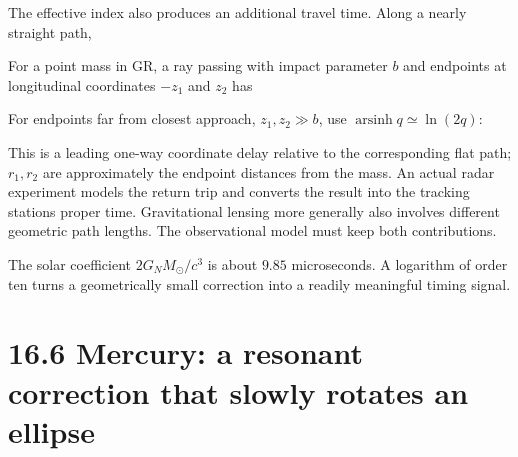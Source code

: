 \documentclass[
  11pt,
  letterpaper,
  oneside,
  openany]{scrbook}
\begin{document}
The effective index also produces an additional travel time. Along a
nearly straight path,

\begin{center}
\begingroup
{}
\ifdim\wd\grmathbox>\linewidth
\resizebox{\linewidth}{!}{\usebox{\grmathbox}}
\else\usebox{\grmathbox}\fi
\endgroup
\end{center}

For a point mass in GR, a ray passing with impact parameter \(b\) and
endpoints at longitudinal coordinates \(-z_1\) and \(z_2\) has

\begin{center}
\begingroup
{}
\ifdim\wd\grmathbox>\linewidth
\resizebox{\linewidth}{!}{\usebox{\grmathbox}}
\else\usebox{\grmathbox}\fi
\endgroup
\end{center}

For endpoints far from closest approach, \(z_1,z_2\gg b\), use
\(\operatorname{arsinh}q\simeq\ln(2q)\):

\begin{center}
\begingroup
{}
\ifdim\wd\grmathbox>\linewidth
\resizebox{\linewidth}{!}{\usebox{\grmathbox}}
\else\usebox{\grmathbox}\fi
\endgroup
\end{center}

This is a leading one-way coordinate delay relative to the corresponding
flat path; \(r_1,r_2\) are approximately the endpoint distances from the
mass. An actual radar experiment models the return trip and converts the
result into the tracking station\textquotesingle s proper time.
Gravitational lensing more generally also involves different geometric
path lengths. The observational model must keep both contributions.

The solar coefficient \(2G_NM_\odot/c^3\) is about \(9.85\)
microseconds. A logarithm of order ten turns a geometrically small
correction into a readily meaningful timing signal.

\hypertarget{mercury-a-resonant-correction-that-slowly-rotates-an-ellipse}{%
\section{16.6 Mercury: a resonant correction that slowly rotates an
ellipse}\label{mercury-a-resonant-correction-that-slowly-rotates-an-ellipse}}
\end{document}
